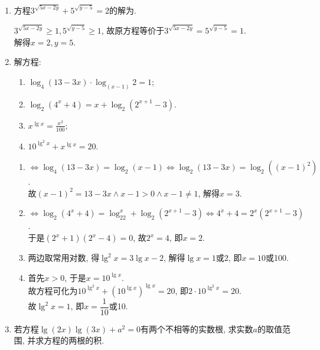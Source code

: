 \begin{enumerate}
    \item 方程$3^{\sqrt{5x-2y}}+5^{\sqrt{y-5}}=2$的解为. 
    \begin{jieda}
    $3^{\sqrt{5x-2y}}\geq 1, 5^{\sqrt{y-5}}\geq 1$, 故原方程等价于$3^{\sqrt{5x-2y}}=5^{\sqrt{y-5}}=1$. \\
    解得$x=2,y=5$. 
    \end{jieda}
    \item 解方程: 
    \begin{enumerate}[(1)] 
    \item $\log_4(13-3x)\cdot\log_{(x-1)}2=1$; 
    \item $\log_2(4^x+4)=x+\log_2(2^{x+1}-3)$. 
    \item $x^{\lg{x}}=\frac{x^3}{100}$; 
    \item $10^{\lg^2x}+x^{\lg{x}}=20$. 
    \end{enumerate}
    \begin{jieda}
    \begin{enumerate}[(1)]
    \item $\iff \log_4(13-3x) = \log_2(x-1)\iff\log_2(13-3x) = \log_2((x-1)^2)$. \\
    故$(x-1)^2=13-3x\land x-1>0\land x-1\neq 1$, 解得$x=3$. 
    \item $\iff\log_2(4^x+4)=\log_22^x+\log_2(2^{x+1}-3)\iff 4^x+4=2^x(2^{x+1}-3)$. \\
    于是$(2^x+1)(2^x-4)=0$, 故$2^x=4$, 即$x=2$. 
    \item 两边取常用对数, 得$\lg^2{x}=3\lg{x}-2$, 解得$\lg{x}=1$或$2$, 即$x=10$或100. 
    
    \item 首先$x>0$, 于是$x=10^{\lg{x}}$. \\
    故方程可化为$10^{\lg^2x}+(10^{\lg{x}})^{\lg{x}}=20$, 即$2\cdot10^{\lg^2x}=20$. \\
    故$\lg^2x=1$, 即$x=\dfrac{1}{10}$或10. 
    \end{enumerate}
    \end{jieda}
     \item 若方程$\lg(2x)\lg(3x)+a^2=0$有两个不相等的实数根, 求实数$a$的取值范围, 并求方程的两根的积. 


\end{enumerate}
